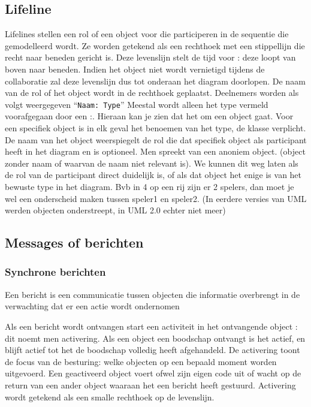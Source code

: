 \subsection{Lifeline}
Lifelines stellen een rol of een object voor die participeren in de sequentie die gemodelleerd wordt. Ze worden getekend als een rechthoek met een stippellijn die recht naar beneden gericht is. Deze levenslijn stelt de tijd voor : deze loopt van boven naar beneden. Indien het object niet wordt vernietigd tijdens de collaboratie zal deze levenslijn dus tot onderaan het diagram doorlopen. De naam van de rol of het object wordt in de rechthoek geplaatst. Deelnemers worden als volgt weergegeven ``\texttt{Naam: Type}''  Meestal wordt alleen het type vermeld voorafgegaan door een :. Hieraan kan je zien dat het om een object gaat. Voor een specifiek object is in elk geval het benoemen van het type, de klasse verplicht. De naam van het object weerspiegelt de rol die dat specifiek object als participant heeft in het diagram en is optioneel. Men spreekt van een anoniem object. (object zonder naam of waarvan de naam niet relevant is). We kunnen dit weg laten als de rol van de participant direct duidelijk is, of als dat object het enige is van het bewuste type in het diagram. Bvb in 4 op een rij zijn er 2 spelers, dan moet je wel een onderscheid maken tussen speler1 en speler2. (In eerdere versies van UML werden objecten onderstreept, in UML 2.0 echter niet meer)



\subsection{Messages of berichten}

\subsubsection{Synchrone berichten}
\begin{definition}
Een bericht is een communicatie tussen objecten die informatie overbrengt in de verwachting dat er een actie wordt ondernomen
\end{definition}
Als een bericht wordt ontvangen start een activiteit in het ontvangende object : dit noemt men activering. Als een object een boodschap ontvangt is het actief, en blijft actief tot het de boodschap volledig heeft afgehandeld. De activering toont de focus van de besturing: welke objecten op een bepaald moment worden uitgevoerd. Een geactiveerd object voert ofwel zijn eigen code uit of wacht op de return van een ander object waaraan het een bericht heeft gestuurd. Activering wordt getekend als een smalle rechthoek op de levenslijn. 

